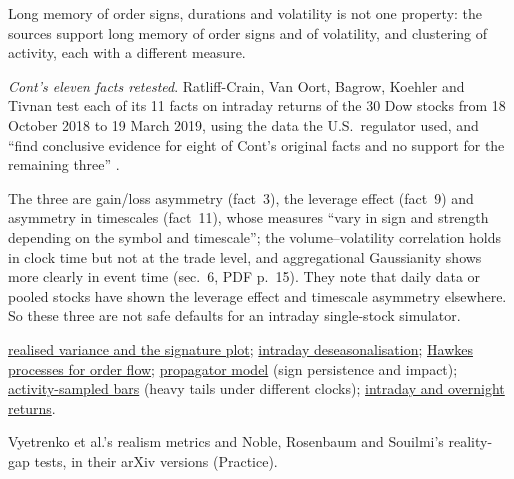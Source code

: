 \begin{qfevidence}
 Long memory of order signs, durations and volatility is not one property: the sources support long memory of order signs and of volatility, and clustering of activity, each with a different measure.

\emph{Cont's eleven facts retested}. Ratliff-Crain, Van Oort, Bagrow, Koehler and Tivnan test each of its 11 facts on intraday returns of the 30 Dow stocks from 18 October 2018 to 19 March 2019, using the data the U.S.\ regulator used, and ``find conclusive evidence for eight of Cont's original facts and no support for the remaining three'' \citep[arXiv 2311.07738v2, abstract and sec.~1, pp.~1--2]{ratliff-crain-2023-stylized}.

The three are gain/loss asymmetry (fact~3), the leverage effect (fact~9) and asymmetry in timescales (fact~11), whose measures ``vary in sign and strength depending on the symbol and timescale''; the volume--volatility correlation holds in clock time but not at the trade level, and aggregational Gaussianity shows more clearly in event time (sec.~6, PDF p.~15). They note that daily data or pooled stocks have shown the leverage effect and timescale asymmetry elsewhere. So these three are not safe defaults for an intraday single-stock simulator.

 \hyperref[meth:realised-variance-signature-plot]{realised variance and the signature plot}; \hyperref[meth:intraday-deseasonalisation]{intraday deseasonalisation}; \hyperref[mod:hawkes-order-flow]{Hawkes processes for order flow}; \hyperref[mod:propagator]{propagator model} (sign persistence and impact); \hyperref[meth:activity-sampled-bars]{activity-sampled bars} (heavy tails under different clocks); \hyperref[def:intraday-overnight-returns]{intraday and overnight returns}.

 Vyetrenko et al.'s realism metrics and Noble, Rosenbaum and Souilmi's reality-gap tests, in their arXiv versions (Practice).

\end{qfevidence}

